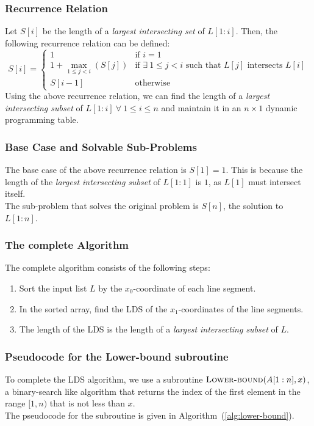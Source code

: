 \documentclass[12pt]{report}
\begin{document}
    \subsubsection*{Recurrence Relation}
    Let $S[i]$ be the length of a \textit{largest intersecting set} of $L[1:i]$.
    Then, the following recurrence relation can be defined:
    \begin{equation}
        S[i] = \begin{cases}
            1 & \text{if } i = 1 \\
            1 + \max_{1 \le j < i} (S[j]) & \text{if } \exists \ 1 \le j < i \text{ such that } L[j] \text{ intersects } L[i] \\
            S[i-1] & \text{otherwise}
        \end{cases}
    \end{equation}
    Using the above recurrence relation, we can find the length of a \textit{largest intersecting subset} of $L[1:i] \ \forall \ 1 \le i \le n$
    and maintain it in an $n \times 1$ dynamic programming table.

    \subsubsection*{Base Case and Solvable Sub-Problems}
    The base case of the above recurrence relation is $S[1] = 1$.
    This is because the length of the \textit{largest intersecting subset} of $L[1:1]$ is $1$, as $L[1]$ must intersect itself.
    \vspace*{10pt} \\
    The sub-problem that solves the original problem is $S[n]$, the solution to $L[1:n]$.

    \subsubsection*{The complete Algorithm}
    The complete algorithm consists of the following steps:
    \begin{enumerate}
        \item Sort the input list $L$ by the $x_{0}$-coordinate of each line segment.
        \item In the sorted array, find the LDS of the $x_{1}$-coordinates of the line segments.
        \item The length of the LDS is the length of a \textit{largest intersecting subset} of $L$.
    \end{enumerate}

    \subsubsection*{Pseudocode for the Lower-bound subroutine}
    To complete the LDS algorithm, we use a subroutine $\Call{Lower-bound}{A[1:n], x}$, a binary-search like algorithm that
    returns the index of the first element in the range $[1, n)$ that is not less than $x$.
    \vspace*{10pt}\\
    The pseudocode for the subroutine is given in Algorithm~(\ref{alg:lower-bound}).
\end{document}
